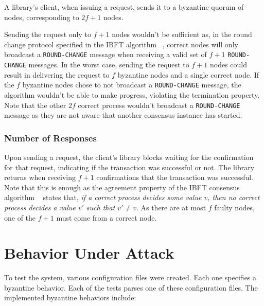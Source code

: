 \documentclass[letterpaper,twocolumn,10pt]{article}
\begin{document}
A library's client, when issuing a request, sends it to a byzantine quorum of nodes, corresponding to $2f + 1$ nodes.

Sending the request only to $f + 1$ nodes wouldn't be sufficient as, in the round change protocol specified in the IBFT algorithm ~\cite{ibft}, correct nodes will only broadcast a \texttt{ROUND-CHANGE} message when receiving a valid set of $f + 1$ \texttt{ROUND-CHANGE} messages. In the worst case, sending the request to $f + 1$ nodes could result in delivering the request to $f$ byzantine nodes and a single correct node. If the $f$ byzantine nodes chose to not broadcast a \texttt{ROUND-CHANGE} message, the algorithm wouldn't be able to make progress, violating the termination property. Note that the other $2f$ correct process wouldn't broadcast a \texttt{ROUND-CHANGE} message as they are not aware that another consensus instance has started.

\subsubsection{Number of Responses}
\label{responses}

Upon sending a request, the client's library blocks waiting for the confirmation for that request, indicating if the transaction was successful or not. The library returns when receiving $f + 1$ confirmations that the transaction was successful. Note that this is enough as the agreement property of the IBFT consensus algorithm ~\cite{ibft} states that, \textit{if a correct process decides some value $v$, then no correct process decides a value $v'$ such that $v' \neq v$}. As there are at most $f$ faulty nodes, one of the $f + 1$ must come from a correct node.

\section{Behavior Under Attack}

To test the system, various configuration files were created. Each one specifies a byzantine behavior. Each of the tests parses one of these configuration files. The implemented byzantine behaviors include:
\end{document}
